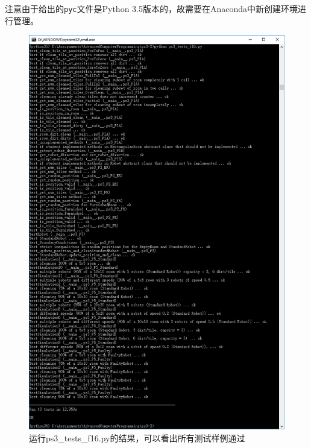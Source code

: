 \documentclass[logo,reportComp]{thesis}
\begin{document}
注意由于给出的\verb'pyc'文件是Python 3.5版本的，故需要在Anaconda中新创建环境进行管理。
\begin{figure}[H]
\centering
\includegraphics[width=\linewidth]{fig/test.png}
\caption{运行ps3\_tests\_f16.py的结果，可以看出所有测试样例通过}
\label{fig:all}
\end{figure}
\end{document}
